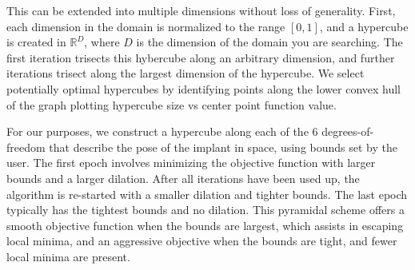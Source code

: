 This can be extended into multiple dimensions without loss of generality. First, each dimension in the domain is normalized to the range $[0,1]$, and a hypercube is created in $\mathbb{R}^D$, where $D$ is the dimension of the domain you are searching. The first iteration trisects this hybercube along an arbitrary dimension, and further iterations trisect along the largest dimension of the hypercube. We select potentially optimal hypercubes by identifying points along the lower convex hull of the graph plotting hypercube size vs center point function value.


For our purposes, we construct a hypercube along each of the 6 degrees-of-freedom that describe the pose of the implant in space, using bounds set by the user. The first epoch involves minimizing the objective function with larger bounds and a larger dilation. After all iterations have been used up, the algorithm is re-started with a smaller dilation and tighter bounds. The last epoch typically has the tightest bounds and no dilation. This pyramidal scheme offers a smooth objective function when the bounds are largest, which assists in escaping local minima, and an aggressive objective when the bounds are tight, and fewer local minima are present.

